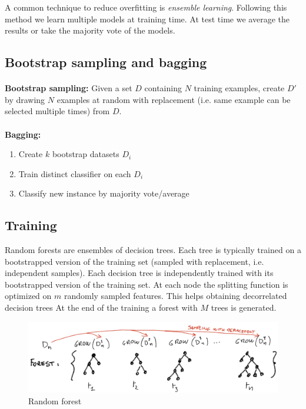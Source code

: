 A common technique to reduce overfitting is \textit{ensemble learning}. Following
this method we learn multiple models at training time. At test time we average
the results or take the majority vote of the models.

\subsection{Bootstrap sampling and bagging}
\paragraph{}
\textbf{Bootstrap sampling:} Given a set $D$ containing $N$ training examples, create
$D'$ by drawing $N$ examples at random with replacement (i.e. same example can be
selected multiple times) from $D$.
\paragraph{}
\textbf{Bagging:}
\begin{enumerate}
	\item Create $k$ bootstrap datasets $D_{i}$

	\item Train distinct classifier on each $D_{i}$

	\item Classify new instance by majority vote/average
\end{enumerate}

\subsection{Training}
Random forests are ensembles of decision trees. Each tree is typically trained on
a bootstrapped version of the training set (sampled with replacement, i.e.
independent samples). Each decision tree is independently trained with its
bootstrapped version of the training set. At each node the splitting function is
optimized on $m$ randomly sampled features. This helps obtaining decorrelated
decision trees At the end of the training a forest with $M$ trees is generated.
\begin{figure}[H]
	\centering
	\includegraphics[width=\textwidth]{images/02_DecisionTrees_randomForest.png}
	\caption{Random forest}
	\label{rf}
\end{figure}

